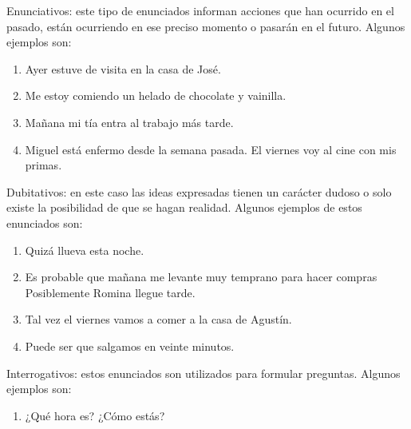 \begin{lista}

\item Enunciativos: este tipo de enunciados informan acciones que
han ocurrido en el pasado, están ocurriendo en ese preciso momento
o pasarán en el futuro. Algunos ejemplos son: \medskip{}
\begin{ejems}{}\begin{enumerate}

\item Ayer estuve de visita en la casa de José. 

\item Me estoy comiendo un helado de chocolate y vainilla. 

\item Mañana mi tía entra al trabajo más tarde. 

\item Miguel está enfermo desde la semana pasada. El viernes voy
al cine con mis primas. \end{enumerate}\end{ejems}

\item Dubitativos: en este caso las ideas expresadas tienen un carácter
dudoso o solo existe la posibilidad de que se hagan realidad. Algunos
ejemplos de estos enunciados son: \medskip{}
\begin{ejems}{}\begin{enumerate}

\item Quizá llueva esta noche.

\item Es probable que mañana me levante muy temprano para hacer compras
Posiblemente Romina llegue tarde. 

\item Tal vez el viernes vamos a comer a la casa de Agustín. 

\item Puede ser que salgamos en veinte minutos.

\end{enumerate}\end{ejems}

\item Interrogativos: estos enunciados son utilizados para formular
preguntas. Algunos ejemplos son:\medskip{}
\begin{ejems}{}\begin{enumerate} 

\item ¿Qué hora es? ¿Cómo estás?


\end{enumerate}
\end{ejems}
\end{lista}
